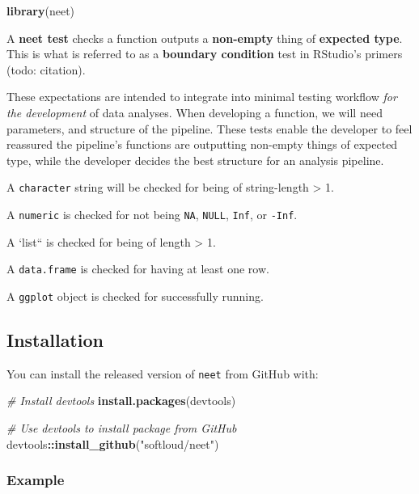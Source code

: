 \documentclass[
]{article}
\newenvironment{Shaded}{\begin{snugshade}}{\end{snugshade}}
\newcommand{\CommentTok}[1]{\textcolor[rgb]{0.56,0.35,0.01}{\textit{#1}}}
\newcommand{\KeywordTok}[1]{\textcolor[rgb]{0.13,0.29,0.53}{\textbf{#1}}}
\newcommand{\NormalTok}[1]{#1}
\newcommand{\OperatorTok}[1]{\textcolor[rgb]{0.81,0.36,0.00}{\textbf{#1}}}
\newcommand{\StringTok}[1]{\textcolor[rgb]{0.31,0.60,0.02}{#1}}
\begin{document}
\begin{Shaded}
\begin{Highlighting}[]
\KeywordTok{library}\NormalTok{(neet)}
\end{Highlighting}
\end{Shaded}

A \textbf{neet test} checks a function outputs a \textbf{non-empty}
thing of \textbf{expected type}. This is what is referred to as a
\textbf{boundary condition} test in RStudio's primers (todo: citation).

These expectations are intended to integrate into minimal testing
workflow \emph{for the development} of data analyses. When developing a
function, we will need parameters, and structure of the pipeline. These
tests enable the developer to feel reassured the pipeline's functions
are outputting non-empty things of expected type, while the developer
decides the best structure for an analysis pipeline.

A \texttt{character} string will be checked for being of string-length
\textgreater{} 1.

A \texttt{numeric} is checked for not being \texttt{NA}, \texttt{NULL},
\texttt{Inf}, or \texttt{-Inf}.

A `list`` is checked for being of length \textgreater{} 1.

A \texttt{data.frame} is checked for having at least one row.

A \texttt{ggplot} object is checked for successfully running.

\hypertarget{installation}{%
\subsection{Installation}\label{installation}}

You can install the released version of \texttt{neet} from GitHub with:

\begin{Shaded}
\begin{Highlighting}[]
\CommentTok{\# Install devtools}
\KeywordTok{install.packages}\NormalTok{(devtools) }

\CommentTok{\# Use devtools to install package from GitHub}
\NormalTok{devtools}\OperatorTok{::}\KeywordTok{install\_github}\NormalTok{(}\StringTok{"softloud/neet"}\NormalTok{)}
\end{Highlighting}
\end{Shaded}

\hypertarget{example}{%
\subsubsection{Example}\label{example}}
\end{document}
